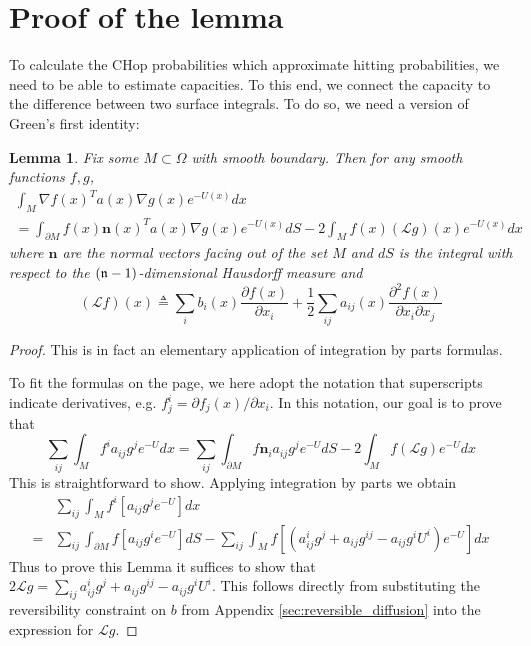 \documentclass[english, aip, jcp, priprint, graphicx,floatfix]{revtex4-1}
\newtheorem{lemma}{Lemma}
\theoremstyle{plain}
\theoremstyle{definition}
\theoremstyle{plain}
\begin{document}
                                                            


\section{Proof of the lemma}\label{sec:proof_lemma}

To calculate the CHop probabilities which approximate hitting probabilities, we need to be able to estimate capacities.  To this end, we connect the capacity to the difference between two surface integrals.  To do so, we need a version of Green's first identity:

\begin{lemma}  \label{ref:greenident}Fix some $M \subset \Omega$ with smooth boundary.  Then for any smooth functions $f,g$,
\begin{gather*}
\int_{M} \nabla f(x)^T a(x) \nabla g(x) e^{-U(x)}dx \\
= \int_{\partial M} f(x) \mathbf{n}(x)^T a(x) \nabla g(x) e^{-U(x)}dS - 2\int_{M} f(x) (\mathcal{L}g)(x)e^{-U(x)}dx
\end{gather*}
where $\mathbf{n}$ are the normal vectors facing out of the set $M$ and $dS$ is the integral with respect to the $({\mathfrak{n}}-1)$-dimensional Hausdorff measure and 
\[
(\mathcal{L}f)(x) \triangleq \sum_i b_i(x) \frac{\partial f (x)}{\partial x_i} + 
    \frac{1}{2} \sum_{ij}a_{ij}(x)\frac{\partial^2 f(x)}{\partial x_i \partial x_j} 
\]
\end{lemma}
\begin{proof}
This is in fact an elementary application of integration by parts formulas.  

To fit the formulas on the page, we here adopt the notation that superscripts indicate derivatives, e.g. $f^i_j  = \partial f_j(x)/\partial x_i$.  In this notation, our goal is to prove that
\[
\sum_{ij} \int_{M} f^i a_{ij} g^j e^{-U}dx 
= \sum_{ij}\int_{\partial M} f \mathbf{n}_i a_{ij} g^j e^{-U}dS - 2\int_{M} f (\mathcal{L}g)e^{-U}dx
\]
This is straightforward to show.  Applying integration by parts we obtain
    \begin{align*}
    &\sum_{ij} \int_{M} f^i \left[a_{ij} g^j e^{-U}\right]dx \\ 
    =&\sum_{ij} \int_{\partial M} f \left[a_{ij} g^i e^{-U}\right]dS - 
            \sum_{ij}\int_{M} f  \left[(a^i_{ij} g^j +a_{ij} g^{ij} - a_{ij} g^i U^i) e^{-U}\right]dx
    \end{align*}
Thus to prove this Lemma it suffices to show that $2\mathcal{L}g=\sum_{ij}a^i_{ij} g^j +a_{ij} g^{ij} - a_{ij} g^i U^i$.  This follows directly from substituting the reversibility constraint on $b$ from Appendix \ref{sec:reversible_diffusion} into the expression for $\mathcal{L}g$.
\end{proof}
\end{document}
